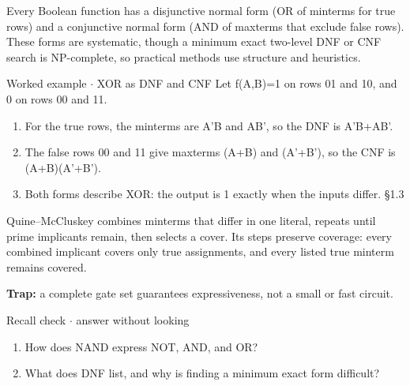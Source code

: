\documentclass[11pt]{article}
\begin{document}
\begin{keepsection}
\begin{keepsection}
Every Boolean function has a disjunctive normal form (OR of minterms for true rows) and a conjunctive normal form (AND of maxterms that exclude false rows). These forms are systematic, though a minimum exact two-level DNF or CNF search is NP-complete, so practical methods use structure and heuristics.

\begin{workedbox}{Worked example \ensuremath{\cdot} XOR as DNF and CNF}
Let f(A,B)=1 on rows 01 and 10, and 0 on rows 00 and 11.

\begin{enumerate}
\item For the true rows, the minterms are A'B and AB', so the DNF is A'B+AB'.
\item The false rows 00 and 11 give maxterms (A+B) and (A'+B'), so the CNF is (A+B)(A'+B').
\item Both forms describe XOR: the output is 1 exactly when the inputs differ. \hfill{\small\color{FAUblue}§1.3}
\end{enumerate}
\end{workedbox}

Quine–McCluskey combines minterms that differ in one literal, repeats until prime implicants remain, then selects a cover. Its steps preserve coverage: every combined implicant covers only true assignments, and every listed true minterm remains covered.

\begin{notebox}\textbf{Trap:} a complete gate set guarantees expressiveness, not a small or fast circuit.\end{notebox}

\begin{recallbox}{Recall check \ensuremath{\cdot} answer without looking}
\begin{enumerate}
\item How does NAND express NOT, AND, and OR?
\item What does DNF list, and why is finding a minimum exact form difficult?
\end{enumerate}

\end{recallbox}
\end{keepsection}
\end{keepsection}
\end{document}
